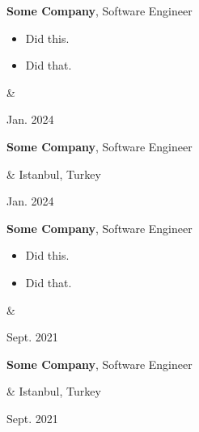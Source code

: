 \documentclass[10pt, letterpaper]{article}
\newenvironment{highlights}{
        \begin{itemize}[
                topsep=0pt,
                parsep=0.10 cm,
                partopsep=0pt,
                itemsep=0pt,
                after=\vspace{-1\baselineskip},
                leftmargin=0.4 cm + 3pt
            ]
    }{
        \end{itemize}
    } %
\let\originalTabularx\tabularx
\let\originalEndTabularx\endtabularx
\renewenvironment{tabularx}{\bgroup\centering\originalTabularx}{\originalEndTabularx\par\egroup}
\begin{document}
        \vspace{0.2 cm}
        \begin{tabularx}{
            \textwidth-0.4 cm-0.13cm
        }{
            K{0.2 cm}
            R{4.1 cm}
        }
            \textbf{Some Company}, Software Engineer

            \vspace{0.10 cm}

            \begin{highlights}
                \item Did this.
                \item Did that.
            \end{highlights}
            &
            

            Jan. 2024
        \end{tabularx}

        \vspace{0.2 cm}
        \begin{tabularx}{
            \textwidth-0.4 cm-0.13cm
        }{
            K{0.2 cm}
            R{4.1 cm}
        }
            \textbf{Some Company}, Software Engineer

            \vspace{0.10 cm}

            &
            Istanbul, Turkey

            Jan. 2024
        \end{tabularx}

        \vspace{0.2 cm}
        \begin{tabularx}{
            \textwidth-0.4 cm-0.13cm
        }{
            K{0.2 cm}
            R{4.1 cm}
        }
            \textbf{Some Company}, Software Engineer

            \vspace{0.10 cm}

            \begin{highlights}
                \item Did this.
                \item Did that.
            \end{highlights}
            &
            

            Sept. 2021
        \end{tabularx}

        \vspace{0.2 cm}
        \begin{tabularx}{
            \textwidth-0.4 cm-0.13cm
        }{
            K{0.2 cm}
            R{4.1 cm}
        }
            \textbf{Some Company}, Software Engineer

            \vspace{0.10 cm}

            &
            Istanbul, Turkey

            Sept. 2021
        \end{tabularx}
\end{document}
